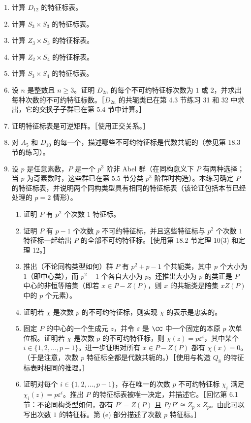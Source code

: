 \begin{enumerate}[label=\arabic*.]
  \item 计算 $D_{12}$ 的特征标表。
  \item 计算 $S_3\times S_3$ 的特征标表。
  \item 计算 $Z_3\times S_3$ 的特征标表。
  \item 计算 $Z_2\times S_4$ 的特征标表。
  \item 计算 $S_3\times S_4$ 的特征标表。
  \item 设 $n$ 是整数且 $n\geq3$。证明 $D_{2n}$ 的每个不可约特征标次数为 $1$ 或 $2$，并求出每种次数的不可约特征标数。［$D_{2n}$ 的共轭类已在第 4.3 节练习 31 和 32 中求出，它的交换子子群已在第 5.4 节中计算。］
  \item 证明特征标表是可逆矩阵。［使用正交关系。］
  \item 对 $A_5$ 和 $D_{10}$ 的每一个，描述哪些不可约特征标是代数共轭的（参见第 18.3 节的练习）。
  \item 设 $p$ 是任意素数，$P$ 是一个 $p^3$ 阶非 Abel 群（在同构意义下 $P$ 有两种选择；当 $p$ 为奇素数时，这些群已在第 5.5 节分类 $p^3$ 阶群时构造）。本练习确定 $P$ 的特征标表，并说明两个同构类型具有相同的特征标表（该论证包括本节已经处理的 $p=2$ 情形）。
  \begin{enumerate}[label=(\alph*)]
    \item 证明 $P$ 有 $p^2$ 个次数 $1$ 特征标。
    \item 证明 $P$ 有 $p-1$ 个次数 $p$ 不可约特征标，并且这些特征标与 $p^2$ 个次数 $1$ 特征标一起给出 $P$ 的全部不可约特征标。［使用第 18.2 节定理 10(3) 和定理 12。］
    \item 推出（不论同构类型如何）群 $P$ 有 $p^2+p-1$ 个共轭类，其中 $p$ 个大小为 $1$（即中心类），而 $p^2-1$ 个各自大小为 $p$。还推出大小为 $p$ 的类正是 $P$ 中心的非恒等陪集（即若 $x\in P-Z(P)$，则 $x$ 的共轭类是陪集 $xZ(P)$ 中的 $p$ 个元素）。
    \item 证明若 $\chi$ 是次数 $p$ 的不可约特征标，则实现 $\chi$ 的表示是忠实的。
    \item 固定 $P$ 的中心的一个生成元 $z$，并令 $\varepsilon$ 是 $\CC$ 中一个固定的本原 $p$ 次单位根。证明若 $\chi$ 是次数 $p$ 的不可约特征标，则 $\chi(z)=p\varepsilon^i$，其中某个 $i\in\{1,2,\ldots,p-1\}$。进一步证明对所有 $x\in P-Z(P)$ 都有 $\chi(x)=0$。（于是注意，次数 $p$ 特征标全都是代数共轭的。）［使用与构造 $Q_8$ 的特征标表时相同的推理。］
    \item 证明对每个 $i\in\{1,2,\ldots,p-1\}$，存在唯一的次数 $p$ 不可约特征标 $\chi_i$ 满足 $\chi_i(z)=p\varepsilon^i$。推出 $P$ 的特征标表被唯一决定，并描述它。［回忆第 6.1 节：不论同构类型如何，都有 $P'=Z(P)$ 且 $P/P'\cong Z_p\times Z_p$。由此可以写出次数 $1$ 的特征标。第 (e) 部分描述了次数 $p$ 特征标。］
  \end{enumerate}
\end{enumerate}

